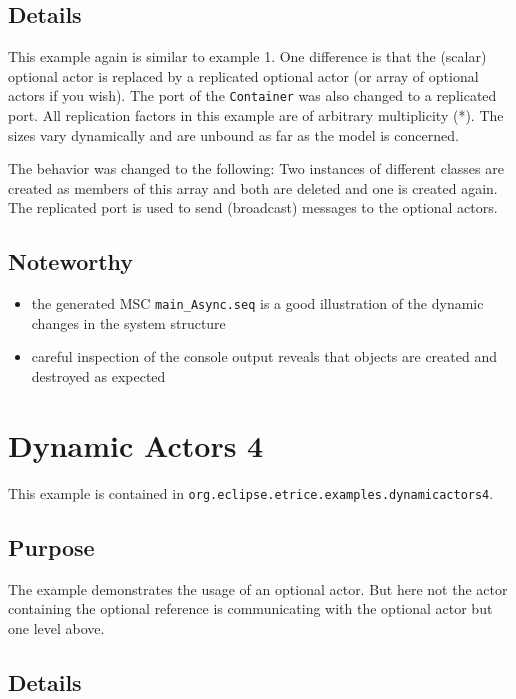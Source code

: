 \subsection{Details}

This example again is similar to example 1. One difference is that the (scalar) optional actor is replaced by a
replicated optional actor (or array of optional actors if you wish).
The port of the \texttt{Container} was also changed to a replicated port. All replication factors in this example
are of arbitrary multiplicity (*). The sizes vary dynamically and are unbound as far as the model is concerned.

The behavior was changed to the following:
Two instances of different classes are created as members of this array and both are deleted and one is created again.
The replicated port is used to send (broadcast) messages to the optional actors.

\subsection{Noteworthy}

\begin{itemize}
\item the generated MSC \texttt{main\_Async.seq} is a good illustration of the dynamic changes in the system structure
\item careful inspection of the console output reveals that objects are created and destroyed as expected
\end{itemize}

\section{Dynamic Actors 4}

This example is contained in \texttt{org.eclipse.etrice.examples.dynamicactors4}.

\subsection{Purpose}

The example demonstrates the usage of an optional actor. But here not the actor containing the optional reference
is communicating with the optional actor but one level above.

\subsection{Details}

